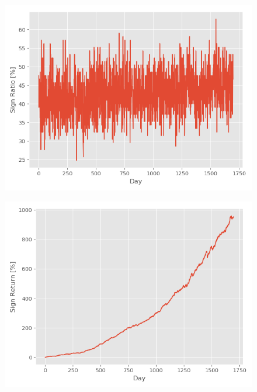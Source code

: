 \begin{figure}
\centering
\begin{minipage}{.5\textwidth}
  \centering
  \includegraphics[scale=0.5]{Plot/EvaluationSignRatio.png}
  \label{SignRatio}
\end{minipage}%
\begin{minipage}{.5\textwidth}
  \centering
  \includegraphics[scale=0.5]{Plot/EvaluationSignReturn.png}
  \label{SignReturn}
\end{minipage}
\end{figure}
